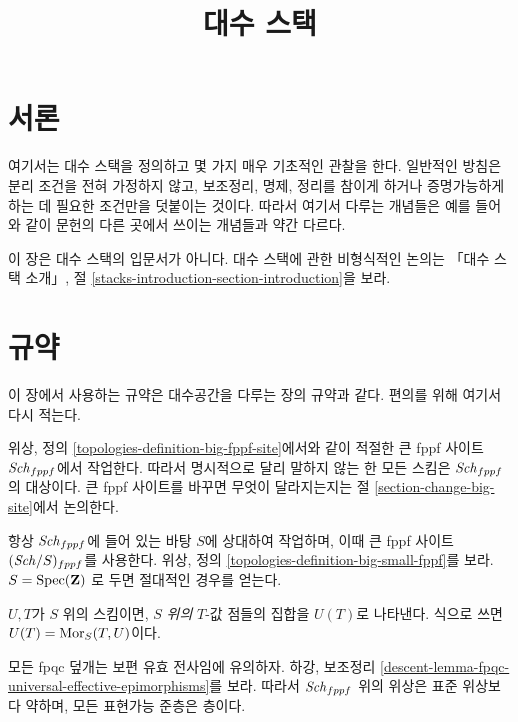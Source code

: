 

%


\title{대수 스택}


\maketitle

\label{section-phantom}

\tableofcontents

\section{서론}
\label{section-introduction}

\noindent
여기서는 대수 스택을 정의하고 몇 가지 매우 기초적인 관찰을 한다.
일반적인 방침은 분리 조건을 전혀 가정하지 않고, 보조정리, 명제, 정리를
참이게 하거나 증명가능하게 하는 데 필요한 조건만을 덧붙이는 것이다.
따라서 여기서 다루는 개념들은 예를 들어 \cite{LM-B}와 같이 문헌의 다른
곳에서 쓰이는 개념들과 약간 다르다.

\medskip\noindent
이 장은 대수 스택의 입문서가 아니다. 대수 스택에 관한 비형식적인 논의는
「대수 스택 소개」, 절 \ref{stacks-introduction-section-introduction}을 보라.


\section{규약}
\label{section-conventions}

\noindent
이 장에서 사용하는 규약은 대수공간을 다루는 장의 규약과 같다.
편의를 위해 여기서 다시 적는다.

\medskip\noindent
위상, 정의 \ref{topologies-definition-big-fppf-site}에서와 같이 적절한
큰 fppf 사이트 $\mathit{Sch}_{fppf}$에서 작업한다. 따라서 명시적으로 달리
말하지 않는 한 모든 스킴은 $\mathit{Sch}_{fppf}$의 대상이다. 큰 fppf 사이트를
바꾸면 무엇이 달라지는지는 절 \ref{section-change-big-site}에서 논의한다.

\medskip\noindent
항상 $\mathit{Sch}_{fppf}$에 들어 있는 바탕 $S$에 상대하여 작업하며, 이때 큰
fppf 사이트 $(\mathit{Sch}/S)_{fppf}$를 사용한다. 위상, 정의
\ref{topologies-definition-big-small-fppf}를 보라. $S = \mathop{\mathrm{Spec}}(\mathbf{Z})$
로 두면 절대적인 경우를 얻는다.

\medskip\noindent
$U, T$가 $S$ 위의 스킴이면, $S$ {\it 위의} $T$-값 점들의 집합을
$U(T)$로 나타낸다. 식으로 쓰면 $U(T) = \mathop{\mathrm{Mor}}\nolimits_S(T, U)$이다.

\medskip\noindent
모든 fpqc 덮개는 보편 유효 전사임에 유의하자. 하강, 보조정리
\ref{descent-lemma-fpqc-universal-effective-epimorphisms}를 보라.
따라서 $\mathit{Sch}_{fppf}$ 위의 위상은 표준 위상보다 약하며, 모든 표현가능
준층은 층이다.








